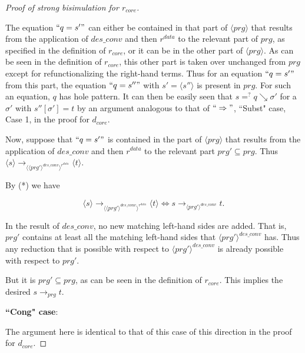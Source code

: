 \begin{proof}[Proof of strong bisimulation for $r_{core}$]
\begin{enumerate}
The equation $`` q = s' "$ can either be contained in that part of $\langle prg \rangle$ that results from the application of $des\_conv$ and then $r^{data}$ to the relevant part of $prg$, as specified in the definition of $r_{core}$, or it can be in the other part of $\langle prg \rangle$. As can be seen in the definition of $r_{core}$, this other part is taken over unchanged from $prg$ except for refunctionalizing the right-hand terms. Thus for an equation $`` q = s' "$ from this part, the equation $`` q = s'' "$ with $s' = \langle s'' \rangle$ is present in $prg$. For such an equation, $q$ has hole pattern. It can then be easily seen that $s =^? q \searrow \sigma'$ for a $\sigma'$ with $s''[\sigma'] = t$ by an argument analogous to that of $`` \Rightarrow "$, ``Subst" case, Case 1, in the proof for $d_{core}$.

Now, suppose that $`` q = s' "$ is contained in the part of $\langle prg \rangle$ that results from the application of $des\_conv$ and then $r^{data}$ to the relevant part $prg' \subseteq prg$. Thus $\langle s \rangle \longrightarrow_{\langle \langle prg' \rangle^{des\_conv} \rangle^{r^{data}}} \langle t \rangle$.

By (*) we have

\begin{equation*}
\langle s \rangle \longrightarrow_{\langle \langle prg' \rangle^{des\_conv} \rangle^{r^{data}}} \langle t \rangle \iff s \longrightarrow_{\langle prg' \rangle^{des\_conv}} t.
\end{equation*}

In the result of $des\_conv$, no new matching left-hand sides are added. That is, $prg'$ contains at least all the matching left-hand sides that $\langle prg' \rangle^{des\_conv}$ has. Thus any reduction that is possible with respect to $\langle prg' \rangle^{des\_conv}$ is already possible with respect to $prg'$.

But it is $prg' \subseteq prg$, as can be seen in the definition of $r_{core}$. This implies the desired $s \longrightarrow_{prg} t$.
\end{enumerate}

\item \textbf{``Cong" case}:

The argument here is identical to that of this case of this direction in the proof for $d_{core}$.

\end{proof}
